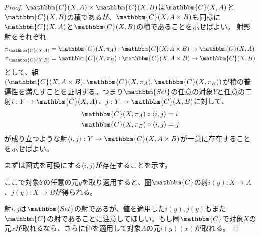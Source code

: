 \documentclass[dvipdfmx]{jsarticle}
\newcommand{\cat}[1]{\mathbbm{#1}}
\newcommand{\arrow}{\rightarrow}
\newcommand{\tuple}[1]{\langle #1\rangle}
\newcommand{\mor}[3]{#1:#2\arrow #3}
\newcommand{\arset}[3]{\cat{#1}(#2,#3)}
\newtheorem{proof}{証明}[section]
\numberwithin{proof}{subsection}
\numberwithin{prop}{subsection}
\numberwithin{define}{subsection}
\begin{document}
	\begin{proof}
		$\arset{C}{X}{A}\times\arset{C}{X}{B}$は$\arset{C}{X}{A}$と$\arset{C}{X}{B}$の積であるが、$\arset{C}{X}{A\times B}$も同様に$\arset{C}{X}{A}$と$\arset{C}{X}{B}$の積であることを示せばよい。
		射影射をそれぞれ
		\begin{align*}
			&\pi_{\arset{C}{X}{A}}=\mor{\arset{C}{X}{\pi_A}}{\arset{C}{X}{A\times B}}{\arset{C}{X}{A}}\\
			&\pi_{\arset{C}{X}{B}}=\mor{\arset{C}{X}{\pi_B}}{\arset{C}{X}{A\times B}}{\arset{C}{X}{B}}
		\end{align*}
		として、組$(\arset{C}{X}{A\times B},\arset{C}{X}{\pi_A},\arset{C}{X}{\pi_B})$が積の普遍性を満たすことを証明する。つまり$\cat{Set}$の任意の対象$Y$と任意の二射$\mor{i}{Y}{\arset{C}{X}{A}}$、$\mor{j}{Y}{\arset{C}{X}{B}}$に対して、
		\begin{align*}
			&\arset{C}{X}{\pi_A}\circ\tuple{i,j}=i\\
			&\arset{C}{X}{\pi_B}\circ\tuple{i,j}=j
		\end{align*}
		が成り立つような射$\mor{\tuple{i,j}}{Y}{\arset{C}{X}{A\times B}}$が一意に存在することを示せばよい。

		まずは図式を可換にする$\tuple{i,j}$が存在することを示す。
		\begin{center}
		\end{center}
		ここで対象$Y$の任意の元$y$を取り適用すると、圏$\cat{C}$の射$\mor{i(y)}{X}{A}$、$\mor{j(y)}{X}{B}$が得られる。

		射$i,j$は$\cat{Set}$の射であるが、値を適用した$i(y),j(y)$もまた$\cat{C}$の射であることに注意してほしい。もし圏$\cat{C}$で対象$X$の元$x$が取れるなら、さらに値を適用して対象$A$の元$i(y)(x)$が取れる。


\end{proof}
\end{document}
